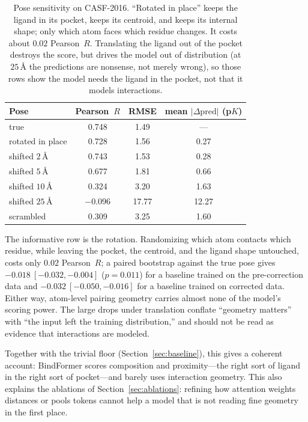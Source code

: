 \documentclass[11pt]{article}
\newcommand{\Ang}{\mbox{\AA}}  %
\newcommand{\pearson}{Pearson~$R$}
\begin{document}
\begin{table}[t]
\centering
\begin{tabular}{lccc}
\toprule
Pose & \pearson{} & RMSE & mean $|\Delta\mathrm{pred}|$ (p$K$) \\
\midrule
true                 & 0.748 & 1.49 & --- \\
rotated in place     & 0.728 & 1.56 & 0.27 \\
shifted $2\,\Ang$    & 0.743 & 1.53 & 0.28 \\
shifted $5\,\Ang$    & 0.677 & 1.81 & 0.66 \\
shifted $10\,\Ang$   & 0.324 & 3.20 & 1.63 \\
shifted $25\,\Ang$   & $-0.096$ & 17.77 & 12.27 \\
scrambled            & 0.309 & 3.25 & 1.60 \\
\bottomrule
\end{tabular}
\caption{Pose sensitivity on CASF-2016. ``Rotated in place'' keeps the ligand in its
pocket, keeps its centroid, and keeps its internal shape; only which atom faces which
residue changes. It costs about $0.02$ \pearson{}. Translating the ligand out of the pocket
destroys the score, but drives the model out of distribution (at $25\,\Ang$ the predictions
are nonsense, not merely wrong), so those rows show the model needs the ligand in the
pocket, not that it models interactions.}
\label{tab:pose}
\end{table}

The informative row is the rotation. Randomizing which atom contacts which residue, while
leaving the pocket, the centroid, and the ligand shape untouched, costs only $0.02$
\pearson{}; a paired bootstrap against the true pose gives $-0.018\ [-0.032, -0.004]$
($p=0.011$) for a baseline trained on the pre-correction data and $-0.032\ [-0.050, -0.016]$
for a baseline trained on corrected data. Either way, atom-level pairing geometry carries
almost none of the model's scoring power. The large drops under translation conflate
``geometry matters'' with ``the input left the training distribution,'' and should not be
read as evidence that interactions are modeled.

Together with the trivial floor (Section~\ref{sec:baseline}), this gives a coherent account:
BindFormer scores composition and proximity---the right sort of ligand in the right sort of
pocket---and barely uses interaction geometry. This also explains the ablations of
Section~\ref{sec:ablations}: refining how attention weights distances or pools tokens cannot
help a model that is not reading fine geometry in the first place.
\end{document}

